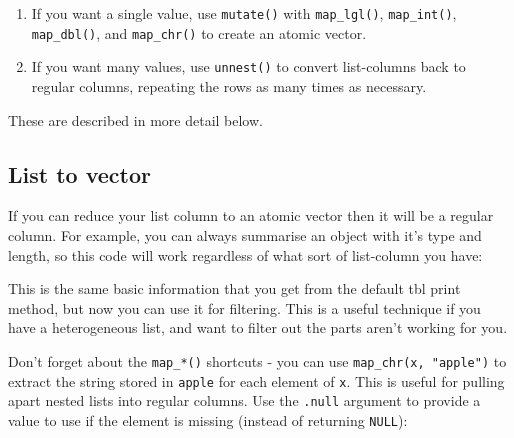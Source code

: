 \documentclass[]{book}
\newenvironment{Shaded}{\begin{snugshade}}{\end{snugshade}}
\newcommand{\KeywordTok}[1]{\textcolor[rgb]{0.13,0.29,0.53}{\textbf{{#1}}}}
\newcommand{\DataTypeTok}[1]{\textcolor[rgb]{0.13,0.29,0.53}{{#1}}}
\newcommand{\DecValTok}[1]{\textcolor[rgb]{0.00,0.00,0.81}{{#1}}}
\newcommand{\StringTok}[1]{\textcolor[rgb]{0.31,0.60,0.02}{{#1}}}
\newcommand{\CommentTok}[1]{\textcolor[rgb]{0.56,0.35,0.01}{\textit{{#1}}}}
\newcommand{\NormalTok}[1]{{#1}}
\begin{document}
\begin{enumerate}
\def\labelenumi{\arabic{enumi}.}
\item
  If you want a single value, use \texttt{mutate()} with
  \texttt{map\_lgl()}, \texttt{map\_int()}, \texttt{map\_dbl()}, and
  \texttt{map\_chr()} to create an atomic vector.
\item
  If you want many values, use \texttt{unnest()} to convert list-columns
  back to regular columns, repeating the rows as many times as
  necessary.
\end{enumerate}

These are described in more detail below.

\subsection{List to vector}\label{list-to-vector}

If you can reduce your list column to an atomic vector then it will be a
regular column. For example, you can always summarise an object with
it's type and length, so this code will work regardless of what sort of
list-column you have:

\begin{Shaded}
\end{Shaded}

This is the same basic information that you get from the default tbl
print method, but now you can use it for filtering. This is a useful
technique if you have a heterogeneous list, and want to filter out the
parts aren't working for you.

Don't forget about the \texttt{map\_*()} shortcuts - you can use
\texttt{map\_chr(x,\ "apple")} to extract the string stored in
\texttt{apple} for each element of \texttt{x}. This is useful for
pulling apart nested lists into regular columns. Use the \texttt{.null}
argument to provide a value to use if the element is missing (instead of
returning \texttt{NULL}):
\end{document}
